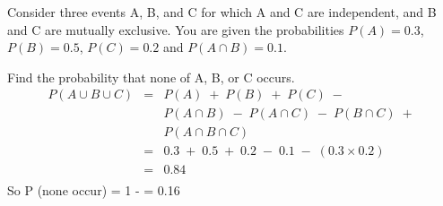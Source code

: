 \documentclass[a4paper,12pt]{article}
\begin{document}
\large
\noindent Consider three events A, B, and C for which A and C are independent, and B and C are
mutually exclusive. You are given the probabilities $P(A) = 0.3$, $P(B) = 0.5$, $P(C) = 0.2$
and $P(A\cap B) = 0.1$.


\noindent Find the probability that none of A, B, or C occurs.
\begin{eqnarray*}
P ( A \cup B \cup C ) &=& P ( A ) \; +  \; P ( B ) \; +  \; P ( C ) \;-\;  \\ 
& &   P ( A \cap B ) \; -\; P ( A \cap C ) \;-\; P ( B \cap C ) \; +  \; \\ & & P ( A \cap B \cap C )\\
&=& 0.3 \; +  \; 0.5 \; +  \; 0.2 \;-\; 0.1 \;-\; (0.3 \times 0.2) \\
&=& 0.84\\
\end{eqnarray*}
So P (none occur) = 1 \;- = 0.16

\end{document}
